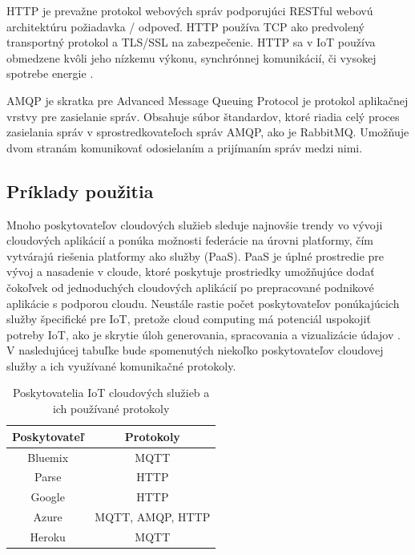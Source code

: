 \documentclass[twoside]{ctuthesis}
\theoremstyle{plain}
\theoremstyle{definition}
\theoremstyle{note}
\begin{document}
HTTP je prevažne protokol webových správ podporujúci RESTful webovú architektúru požiadavka / odpoveď. HTTP používa TCP ako predvolený transportný protokol a TLS/SSL na zabezpečenie. HTTP sa v IoT používa obmedzene kvôli jeho nízkemu výkonu, synchrónnej komunikácií, či vysokej spotrebe energie \cite{protocols} \cite{http}.
\newline

AMQP je skratka pre Advanced Message Queuing Protocol je protokol aplikačnej vrstvy pre zasielanie správ. Obsahuje súbor štandardov, ktoré riadia celý proces zasielania správ v sprostredkovateľoch správ AMQP, ako je RabbitMQ. Umožňuje dvom stranám komunikovať odosielaním a prijímaním správ medzi nimi. \cite{rabbitmq}

\subsection{Príklady použitia}

Mnoho poskytovateľov cloudových služieb sleduje najnovšie trendy vo vývoji cloudových aplikácií a ponúka možnosti federácie na úrovni platformy, čím vytvárajú riešenia platformy ako služby (PaaS). PaaS je úplné prostredie pre vývoj a nasadenie v cloude, ktoré poskytuje prostriedky umožňujúce dodať čokoľvek od jednoduchých cloudových aplikácií po prepracované podnikové aplikácie s podporou cloudu. Neustále rastie počet poskytovateľov ponúkajúcich služby špecifické pre IoT, pretože cloud computing má potenciál uspokojiť potreby IoT, ako je skrytie úloh generovania, spracovania a vizualizácie údajov \cite{PaaS} \cite{iotcloud}.
V nasledujúcej tabuľke bude spomenutých niekoľko poskytovateľov cloudovej služby a ich využívané komunikačné protokoly.
\begin{table}[H]
\caption{Poskytovatelia IoT cloudových služieb a ich používané protokoly \cite{iotcloud}}
\begin{center}
\begin{tabular}{|c|c|}
\hline
Poskytovateľ & Protokoly \\
\hline
Bluemix & MQTT \\
Parse & HTTP \\
Google & HTTP \\
Azure & MQTT, AMQP, HTTP \\
Heroku & MQTT \\
\hline
\end{tabular}
\end{center}
\label{default}
\end{table}%
\end{document}
